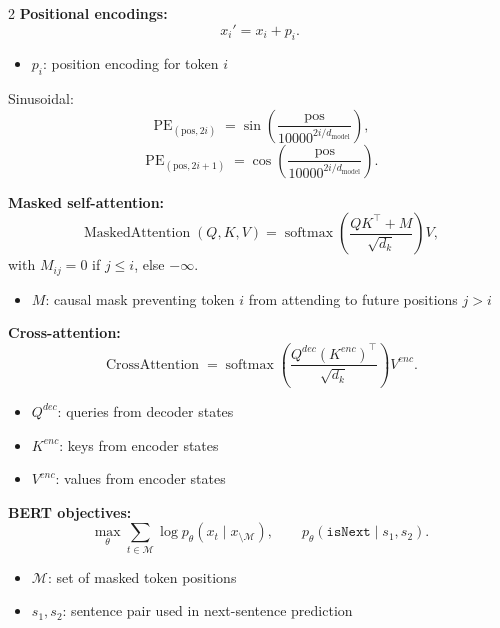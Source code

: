 \documentclass[10pt]{article}
\newcommand{\softmax}{\operatorname{softmax}}
\newenvironment{symdefs}{\begin{itemize}[leftmargin=1.1em, topsep=1pt, itemsep=0pt, parsep=0pt]}{\end{itemize}}
\newcommand{\sym}[2]{\item \textbf{#1}: #2}
\begin{document}
\begin{multicols*}{2}
\textbf{Positional encodings:}
\[
x_i' = x_i + p_i.
\]
\begin{symdefs}
\sym{\(p_i\)}{position encoding for token \(i\)}
\end{symdefs}
Sinusoidal:
\[
\operatorname{PE}_{(\text{pos},2i)}
=
\sin\!\left(\frac{\text{pos}}{10000^{2i/d_{\text{model}}}}\right),
\]
\[
\operatorname{PE}_{(\text{pos},2i+1)}
=
\cos\!\left(\frac{\text{pos}}{10000^{2i/d_{\text{model}}}}\right).
\]

\textbf{Masked self-attention:}
\[
\operatorname{MaskedAttention}(Q,K,V)
=
\softmax\!\left(\frac{QK^\top + M}{\sqrt{d_k}}\right)V,
\]
with \(M_{ij}=0\) if \(j \le i\), else \(-\infty\).
\begin{symdefs}
\sym{\(M\)}{causal mask preventing token \(i\) from attending to future positions \(j>i\)}
\end{symdefs}

\textbf{Cross-attention:}
\[
\operatorname{CrossAttention}
=
\softmax\!\left(
\frac{Q^{dec}(K^{enc})^\top}{\sqrt{d_k}}
\right)V^{enc}.
\]
\begin{symdefs}
\sym{\(Q^{dec}\)}{queries from decoder states}
\sym{\(K^{enc}\)}{keys from encoder states}
\sym{\(V^{enc}\)}{values from encoder states}
\end{symdefs}

\textbf{BERT objectives:}
\[
\max_\theta \sum_{t \in \mathcal{M}} \log p_\theta(x_t \mid x_{\setminus \mathcal{M}}),
\qquad
p_\theta(\texttt{isNext} \mid s_1, s_2).
\]
\begin{symdefs}
\sym{\(\mathcal{M}\)}{set of masked token positions}
\sym{\(s_1,s_2\)}{sentence pair used in next-sentence prediction}
\end{symdefs}


\end{multicols*}
\end{document}
